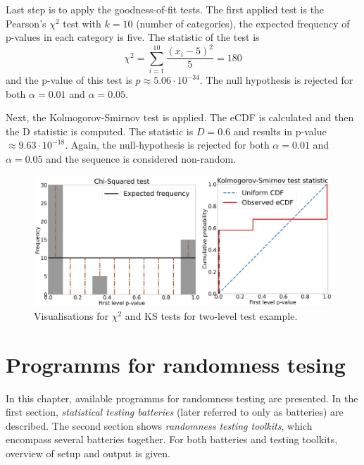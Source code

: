 \documentclass[
  digital,     %
  oneside,     %
  nosansbold,  %
  nocolorbold, %
  nolof,         %
  nolot,         %
]{fithesis4}
\begin{document}
Last step is to apply the goodness-of-fit tests. The first applied test is the Pearson's $\chi^2$ test with $k=10$ (number of categories), the expected frequency of p-values in each category is five. The statistic of the test is
\[\chi^2 = \sum_{i=1}^{10} \dfrac{(x_i - 5)^2}{5} = 180 \]
and the p-value of this test is $p\approx5.06\cdot10^{-34}$. The null hypothesis is rejected for both $\alpha = 0.01$ and $\alpha = 0.05$. 

Next, the Kolmogorov-Smirnov test is applied. The eCDF is calculated and then the D statistic is computed. The statistic is $D = 0.6$ and results in p-value $\approx 9.63\cdot10^{-18}$. Again, the null-hypothesis is rejected for both $\alpha = 0.01$ and $\alpha = 0.05$ and the sequence is considered non-random.

\begin{figure}
  \begin{center}
    \includegraphics[width=12.5cm]{figures/two_example.png}
  \end{center}
  \caption{Visualisations for $\chi^2$ and KS tests for two-level test example.}
  \label{fig:two_example}
\end{figure}


\chapter{Programms for randomness tesing}
In this chapter, available programms for randomness testing are presented. In the first section, \emph{statistical testing batteries} (later referred to only as batteries) are described. The second section shows \emph{randomness testing toolkits}, which encompass several batteries together. For both batteries and testing toolkits, overview of setup and output is given.
\end{document}
